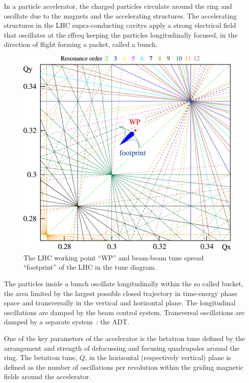 In a particle accelerator, the charged particles circulate around the ring and oscillate due to the magnets and the accelerating structures. The accelerating structures in the \gls{LHC} supra-conducting \glspl{cavity} apply a strong electrical field that oscillates at the \gls{rffreq} keeping the particles longitudinally focused, in the direction of flight forming a packet, called a \gls{bunch}.

\begin{figure}[H]
\centering
\caption{The LHC working point ``WP'' and beam-beam tune spread ``footprint'' of the LHC in the tune diagram.}
\includegraphics[scale=1.25]{lhc_working_point.jpeg}
\end{figure}

The particles inside a bunch oscillate longitudinally within the so called bucket, the area limited by the largest possible closed trajectory in time-energy phase space and transversally in the vertical and horizontal plane. The longitudinal oscillations are damped by the beam control system. Transversal oscillations are damped by a separate system~: the \gls{ADT}\cite{Zhabitsky:1141925,Benews11}.

One of the key parameters of the accelerator is the betatron tune defined by the arrangement and strength of defocussing and focusing quadrupoles around the ring. The betatron tune, $Q$, in the horizontal (respectively vertical) plane is defined as the number of oscillations per revolution within the griding magnetic fields around the accelerator.

